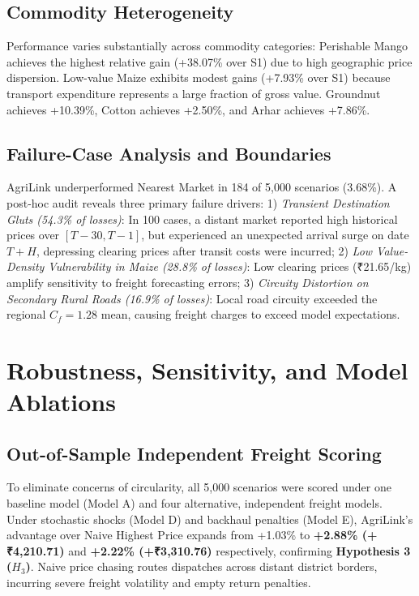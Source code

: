 \documentclass[journal]{IEEEtran}
\begin{document}
\subsection{Commodity Heterogeneity}
Performance varies substantially across commodity categories: Perishable Mango achieves the highest relative gain (+38.07\% over S1) due to high geographic price dispersion. Low-value Maize exhibits modest gains (+7.93\% over S1) because transport expenditure represents a large fraction of gross value. Groundnut achieves +10.39\%, Cotton achieves +2.50\%, and Arhar achieves +7.86\%.

\subsection{Failure-Case Analysis and Boundaries}
AgriLink underperformed Nearest Market in 184 of 5,000 scenarios (3.68\%). A post-hoc audit reveals three primary failure drivers: 1) \textit{Transient Destination Gluts (54.3\% of losses)}: In 100 cases, a distant market reported high historical prices over $[T-30, T-1]$, but experienced an unexpected arrival surge on date $T+H$, depressing clearing prices after transit costs were incurred; 2) \textit{Low Value-Density Vulnerability in Maize (28.8\% of losses)}: Low clearing prices (₹21.65/kg) amplify sensitivity to freight forecasting errors; 3) \textit{Circuity Distortion on Secondary Rural Roads (16.9\% of losses)}: Local road circuity exceeded the regional $C_f = 1.28$ mean, causing freight charges to exceed model expectations.

\section{Robustness, Sensitivity, and Model Ablations}
\subsection{Out-of-Sample Independent Freight Scoring}
To eliminate concerns of circularity, all 5,000 scenarios were scored under one baseline model (Model A) and four alternative, independent freight models. Under stochastic shocks (Model D) and backhaul penalties (Model E), AgriLink's advantage over Naive Highest Price expands from +1.03\% to \textbf{+2.88\% (+₹4,210.71)} and \textbf{+2.22\% (+₹3,310.76)} respectively, confirming \textbf{Hypothesis 3 ($H_3$)}. Naive price chasing routes dispatches across distant district borders, incurring severe freight volatility and empty return penalties.
\end{document}
